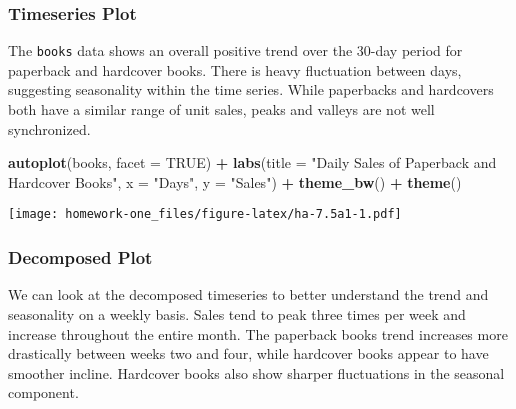 \documentclass[openany]{book}
\newenvironment{Shaded}{\begin{snugshade}}{\end{snugshade}}
\newcommand{\DataTypeTok}[1]{\textcolor[rgb]{0.13,0.29,0.53}{#1}}
\newcommand{\KeywordTok}[1]{\textcolor[rgb]{0.13,0.29,0.53}{\textbf{#1}}}
\newcommand{\NormalTok}[1]{#1}
\newcommand{\OperatorTok}[1]{\textcolor[rgb]{0.81,0.36,0.00}{\textbf{#1}}}
\newcommand{\OtherTok}[1]{\textcolor[rgb]{0.56,0.35,0.01}{#1}}
\newcommand{\StringTok}[1]{\textcolor[rgb]{0.31,0.60,0.02}{#1}}
\begin{document}
\hypertarget{timeseries-plot}{%
\subsubsection{Timeseries Plot}\label{timeseries-plot}}

The \texttt{books} data shows an overall positive trend over the 30-day period for paperback and hardcover books. There is heavy fluctuation between days, suggesting seasonality within the time series. While paperbacks and hardcovers both have a similar range of unit sales, peaks and valleys are not well synchronized.

\begin{Shaded}
\begin{Highlighting}[]
\KeywordTok{autoplot}\NormalTok{(books, }\DataTypeTok{facet =} \OtherTok{TRUE}\NormalTok{) }\OperatorTok{+}\StringTok{ }\KeywordTok{labs}\NormalTok{(}\DataTypeTok{title =} \StringTok{"Daily Sales of Paperback and Hardcover Books"}\NormalTok{, }
  \DataTypeTok{x =} \StringTok{"Days"}\NormalTok{, }\DataTypeTok{y =} \StringTok{"Sales"}\NormalTok{) }\OperatorTok{+}\StringTok{ }\KeywordTok{theme_bw}\NormalTok{() }\OperatorTok{+}\StringTok{ }\KeywordTok{theme}\NormalTok{()}
\end{Highlighting}
\end{Shaded}

\texttt{[image: homework-one\_files/figure-latex/ha-7.5a1-1.pdf]}

\hypertarget{decomposed-plot}{%
\subsubsection{Decomposed Plot}\label{decomposed-plot}}

We can look at the decomposed timeseries to better understand the trend and seasonality on a weekly basis. Sales tend to peak three times per week and increase throughout the entire month. The paperback books trend increases more drastically between weeks two and four, while hardcover books appear to have smoother incline. Hardcover books also show sharper fluctuations in the seasonal component.
\end{document}
